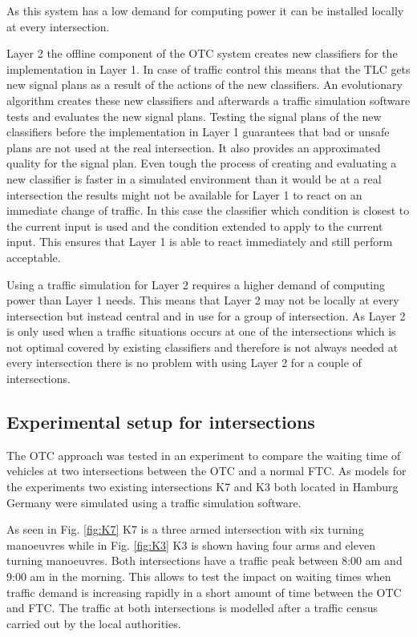 As this system has a low demand for computing power it can be installed locally at every intersection.\cite{organicLCS}

Layer 2 the offline component of the OTC system creates new classifiers for the implementation in Layer 1. In case of traffic control this means that the TLC gets new signal plans as a result of the actions of the new classifiers. An evolutionary algorithm creates these new classifiers and afterwards a traffic simulation software tests and evaluates the new signal plans. 
Testing the signal plans of the new classifiers before the implementation in Layer 1 guarantees that bad or unsafe plans are not used at the real intersection. It also provides an approximated quality for the signal plan. Even tough the process of creating and evaluating a new classifier is faster in a simulated environment than it would be at a real intersection the results might not be available for Layer 1 to react on an immediate change of traffic. In this case the classifier which condition is closest to the current input is used and the condition extended to apply to the current input. This ensures that Layer 1 is able to react immediately and still perform acceptable.\cite{organic1}\cite{organicLCS}

Using a traffic simulation for Layer 2 requires a higher demand of computing power than Layer 1
needs. This means that Layer 2 may not be locally at every intersection but instead central and in use for a group of intersection. As Layer 2 is only used when a traffic situations occurs at one of the intersections which is not optimal covered by existing classifiers and therefore is not always needed at every intersection there is no problem with using Layer 2 for a couple of intersections.\cite{organicLCS}

\subsection{Experimental setup for intersections}
The OTC approach was tested in an experiment to compare the waiting time of vehicles at two intersections between the OTC and a normal FTC. As models for the experiments two existing intersections K7 and K3 both located in Hamburg Germany were simulated using a traffic
simulation software.

As seen in Fig. \ref{fig:K7} K7 is a three armed intersection with six turning manoeuvres  while in Fig. \ref{fig:K3} K3 is shown having four arms and eleven turning manoeuvres. Both intersections have a traffic peak between 8:00 am and 9:00 am in the morning. This allows to test the impact on waiting times when traffic demand is increasing rapidly in a short amount of time between the OTC and FTC. The traffic at both intersections is modelled after a traffic census carried out by the local authorities.\cite{organic1}




